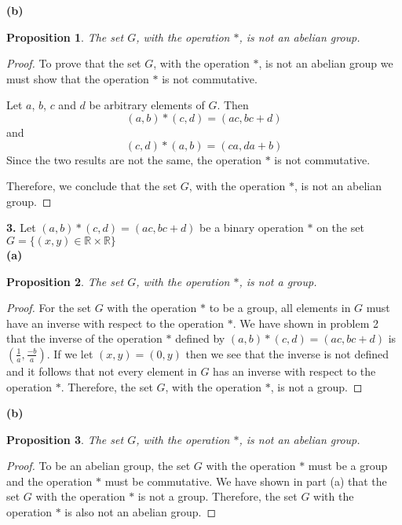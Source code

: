 \documentclass[12pt]{article}   %
\newtheorem*{proposition}{Proposition}  %
\begin{document}
\bigskip
\noindent\textbf{(b)}
\begin{proposition}
The set $G$, with the operation $\ast$, is not an abelian group.
\end{proposition}
\begin{proof}
To prove that the set $G$, with the operation $\ast$, is not an abelian group we must show that the operation $*$ is not commutative.

Let $a$, $b$, $c$ and $d$ be arbitrary elements of $G$. Then
\begin{equation}
(a,b) * (c,d) = (ac,bc+d)
\end{equation}
and
\begin{equation}
(c,d) * (a,b) = (ca, da+b)
\end{equation}
Since the two results are not the same, the operation $\ast$ is not commutative.

Therefore, we conclude that the set $G$, with the operation $\ast$, is not an abelian group.
\end{proof}

\noindent\textbf{3.} \quad Let $(a,b)*(c,d) = (ac, bc + d)$ be a binary operation $*$ on the set $G = \{(x,y) \in \mathbb{R} \times \mathbb{R}\}$ \\

\noindent\textbf{(a)}
\begin{proposition}
The set $G$, with the operation $\ast$, is not a group.
\end{proposition}
\begin{proof}
For the set $G$ with the operation $*$ to be a group, all elements in $G$ must have an inverse with respect to the operation $*$. We have shown in problem 2 that the inverse of the operation $*$ defined by $(a,b)*(c,d) = (ac, bc + d)$ is $(\tfrac{1}{a}, \tfrac{-b}{a})$. If we let $(x,y) = (0,y)$ then we see that the inverse is not defined and it follows that not every element in $G$ has an inverse with respect to the operation $*$. Therefore, the set $G$, with the operation $\ast$, is not a group.
\end{proof}

\bigskip
\noindent\textbf{(b)}
\begin{proposition}
The set $G$, with the operation $\ast$, is not an abelian group.
\end{proposition}
\begin{proof}
To be an abelian group, the set $G$ with the operation $*$ must be a group and the operation $*$ must be commutative. We have shown in part (a) that the set $G$ with the operation $*$ is not a group. Therefore, the set $G$ with the operation $*$ is also not an abelian group. 
\end{proof}
\end{document}
